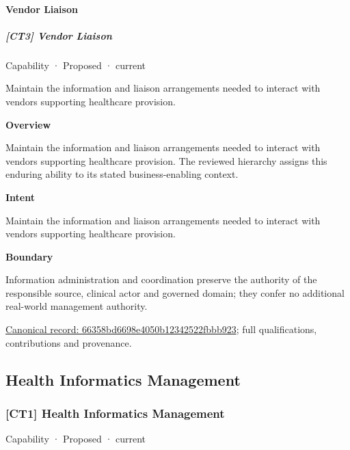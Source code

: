 \paragraph{Vendor Liaison}

\subparagraph{[CT3] Vendor Liaison}

\label{element:66358bd6698e4050b12342522fbbb923}
{\small Capability · Proposed · current}\par

Maintain the information and liaison arrangements needed to interact with vendors supporting healthcare provision.



\textbf{Overview}



Maintain the information and liaison arrangements needed to interact with vendors supporting healthcare provision. The reviewed hierarchy assigns this enduring ability to its stated business-enabling context.



\textbf{Intent}



Maintain the information and liaison arrangements needed to interact with vendors supporting healthcare provision.



\textbf{Boundary}



Information administration and coordination preserve the authority of the responsible source, clinical actor and governed domain; they confer no additional real-world management authority.


{\footnotesize \href{../../../../continuum/strategy/capability/66358bd6698e4050b12342522fbbb923.md}{Canonical record: 66358bd6698e4050b12342522fbbb923}; full qualifications, contributions and provenance.}\par
\subsection{Health Informatics Management}

\subsubsection{[CT1] Health Informatics Management}

\label{element:a790b5f2c5a1497fa6ec09d7824da32e}
{\small Capability · Proposed · current}\par

